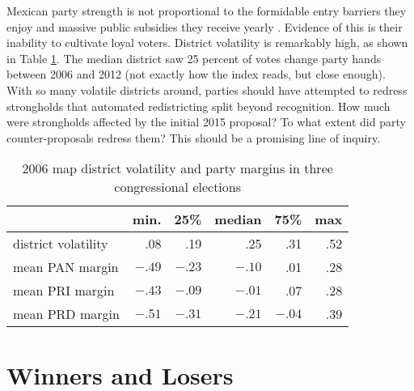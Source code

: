 \documentclass[letter,12pt]{article}
\begin{document}
Mexican party strength is not proportional to the formidable entry barriers they enjoy and massive public subsidies they receive yearly \citep{magar.2007ref.2015}. Evidence of this is their inability to cultivate loyal voters. District volatility is remarkably high, as shown in Table \ref{T:volatMarginsd0}. The median district saw 25 percent of votes change party hands between 2006 and 2012 (not exactly how the index reads, but close enough). With so many volatile districts around, parties should have attempted to redress strongholds that automated redistricting split beyond recognition. How much were strongholds affected by the initial 2015 proposal? To what extent did party counter-proposals redress them? This should be a promising line of inquiry. 

\begin{table}
\begin{center}
\begin{tabular}{lrrrrr}
                    &  min.   &  25\%   & median  & 75\%   & max \\ \hline
district volatility &  .08    & .19     & .25     & .31    & .52 \\
mean PAN margin     &  $-.49$ & $-.23$  & $-.10$  & .01    & .28 \\   
mean PRI margin     &  $-.43$ & $-.09$  & $-.01$  & .07    & .28 \\   
mean PRD margin     &  $-.51$ & $-.31$  & $-.21$  & $-.04$ & .39 \\
\end{tabular}
\caption{2006 map district volatility and party margins in three congressional elections}\label{T:volatMarginsd0}
\end{center}
\end{table}


\section{Winners and Losers}
\end{document}
